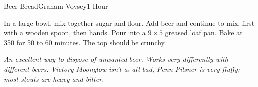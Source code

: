 \begin{recipe}{Beer Bread}{Graham Voysey}{1 Hour}

  In a large bowl,  mix together sugar and flour. Add beer and continue to
  mix, first with a wooden spoon, then hands. Pour into a $9\times 5$ greased
  loaf pan. Bake at 350 for 50 to 60 minutes. The top should be crunchy.
\end{recipe}
\textit{An excellent way to dispose of unwanted beer. Works very differently
  with different beers: Victory Moonglow isn't at all bad, Penn Pilsner is
  very fluffy; most stouts are heavy and bitter.}
